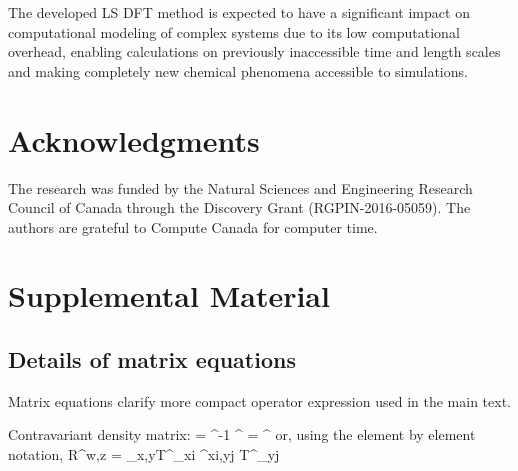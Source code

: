 \documentclass[aps,prl,twocolumn,reprint,amsmath,amssymb]{revtex4-1}
\begin{document}
The developed LS DFT method is expected to have a significant impact on computational modeling of complex systems due to its low computational overhead, enabling calculations on previously inaccessible time and length scales and making completely new chemical phenomena accessible to simulations.

\section{Acknowledgments} The research was funded by the Natural Sciences and Engineering Research Council of Canada through the Discovery Grant (RGPIN-2016-05059). The authors are grateful to Compute Canada for computer time.



\section{Supplemental Material}

\setcounter{equation}{0}
\setcounter{figure}{0}

\renewcommand{\theequation}{S\arabic{equation}}
\renewcommand{\thefigure}{S\arabic{figure}}

\subsection{Details of matrix equations}
Matrix equations clarify more compact operator expression used in the main text. 


Contravariant density matrix:
%
\bea
{} =  \sigma^{-1} ^{\dagger}
\sigma = ^{\dagger}  
\eea
%
or, using the element by element notation,
%
\bea
R^{w\mu,z\nu} = \sum_{x,y}{T^{\mu}}_{xi} \sigma^{xi,yj} {T^{\nu}}_{yj}
\eea
\end{document}

